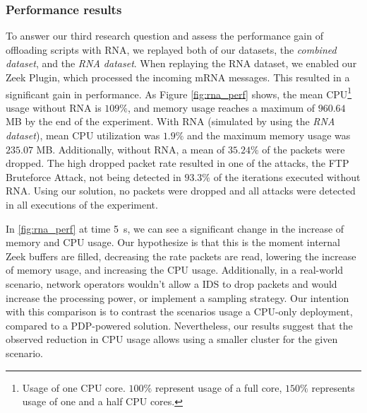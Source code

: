 \subsubsection*{Performance results}

To answer our third research question and assess the performance gain of offloading scripts with RNA, we replayed both of our datasets, the \textit{combined dataset}, and the \textit{RNA dataset}. When replaying the RNA dataset, we enabled our Zeek Plugin, which processed the incoming mRNA messages. This resulted in a significant gain in performance. As Figure \ref{fig:rna_perf} shows, the mean CPU\footnote{Usage of one CPU core. $100\%$ represent usage of a full core, $150\%$ represents usage of one and a half CPU cores.} usage without RNA is $109\%$, and memory usage reaches a maximum of $960.64$ MB by the end of the experiment. With RNA (simulated by using the \textit{RNA dataset}), mean CPU utilization was $1.9\%$ and the maximum memory usage was $235.07$ MB. Additionally, without RNA, a mean of $35.24\%$ of the packets were dropped. The high dropped packet rate resulted in one of the attacks, the FTP Bruteforce Attack, not being detected in $93.3\%$ of the iterations executed without RNA. Using our solution, no packets were dropped and all attacks were detected in all executions of the experiment.

In \autoref{fig:rna_perf} at time \SI{5}{s}, we can see a significant change in the increase of memory and CPU usage. Our hypothesize is that this is the moment internal Zeek buffers are filled, decreasing the rate packets are read, lowering the increase of memory usage, and increasing the CPU usage. Additionally, in a real-world scenario, network operators wouldn't allow a IDS to drop packets and would increase the processing power, or implement a sampling strategy. Our intention with this comparison is to contrast the scenarios usage a CPU-only deployment, compared to a PDP-powered solution. Nevertheless, our results suggest that the observed reduction in CPU usage allows using a smaller cluster for the given scenario.


